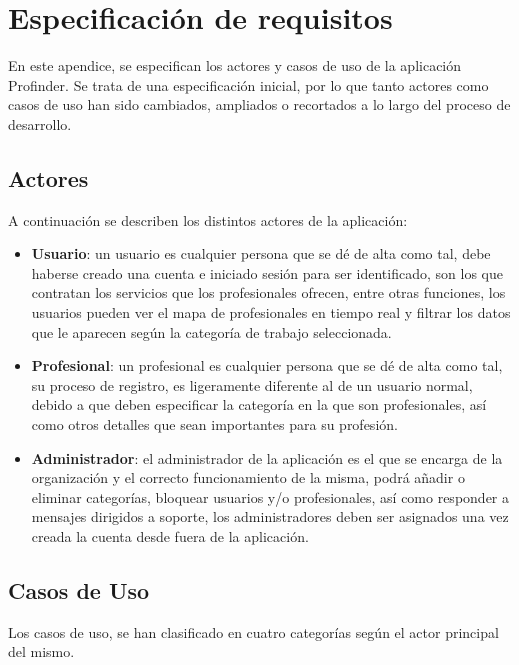 \chapter{Especificación de requisitos}
\label{Appendix:srs}

En este apendice, se especifican los actores y casos de uso de la aplicación Profinder. Se trata de una especificación inicial, por lo que tanto actores como casos de uso han sido cambiados, ampliados o recortados a lo largo del proceso de desarrollo.

\section{Actores}
A continuación se describen los distintos actores de la aplicación:
\begin{itemize}
    \item \textbf{Usuario}: un usuario es cualquier persona que se dé de alta como tal, debe haberse creado una cuenta e iniciado sesión para ser identificado, son los que contratan los servicios que los profesionales ofrecen, entre otras funciones, los usuarios pueden ver el mapa de profesionales en tiempo real y filtrar los datos que le aparecen según la categoría de trabajo seleccionada.
    \item \textbf{Profesional}: un profesional es cualquier persona que se dé de alta como tal, su proceso de registro, es ligeramente diferente al de un usuario normal, debido a que deben especificar la categoría en la que son profesionales, así como otros detalles que sean importantes para su profesión.
    \item \textbf{Administrador}: el administrador de la aplicación es el que se encarga de la organización y el correcto funcionamiento de la misma, podrá añadir o eliminar categorías, bloquear usuarios y/o profesionales, así como responder a mensajes dirigidos a soporte, los administradores deben ser asignados una vez creada la cuenta desde fuera de la aplicación.
\end{itemize}
\section{Casos de Uso}
Los casos de uso, se han clasificado en cuatro categorías según el actor principal del mismo.
\newpage
